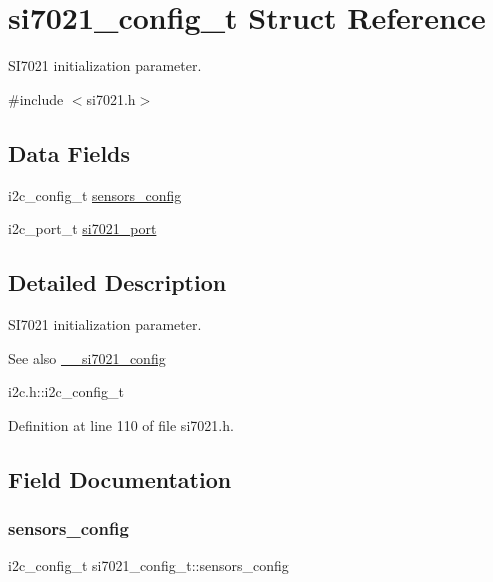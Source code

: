 \hypertarget{structsi7021__config__t}{}\section{si7021\+\_\+config\+\_\+t Struct Reference}
\label{structsi7021__config__t}


S\+I7021 initialization parameter.  




{\ttfamily \#include $<$si7021.\+h$>$}

\subsection*{Data Fields}
\begin{DoxyCompactItemize}
\item 
i2c\+\_\+config\+\_\+t \hyperlink{structsi7021__config__t_a7111e4c680e1eba6473f6a1d72b5456c}{sensors\+\_\+config}
\item 
i2c\+\_\+port\+\_\+t \hyperlink{structsi7021__config__t_ac3b2711d602d8210c52ec5d8680c827f}{si7021\+\_\+port}
\end{DoxyCompactItemize}


\subsection{Detailed Description}
S\+I7021 initialization parameter. 

\begin{DoxySeeAlso}{See also}
\hyperlink{si7021_8c_a7961a32ca6f5fed329358f12119b97b6}{\+\_\+\+\_\+si7021\+\_\+config} 

i2c.\+h\+::i2c\+\_\+config\+\_\+t 
\end{DoxySeeAlso}


Definition at line 110 of file si7021.\+h.



\subsection{Field Documentation}
\mbox{\label{structsi7021__config__t_a7111e4c680e1eba6473f6a1d72b5456c}} 
\subsubsection{\texorpdfstring{sensors\+\_\+config}{sensors\_config}}
{\footnotesize\ttfamily i2c\+\_\+config\+\_\+t si7021\+\_\+config\+\_\+t\+::sensors\+\_\+config}

